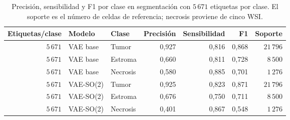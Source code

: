 \begin{table}[htbp]
    \centering
    \caption[Métricas por clase con el presupuesto completo.]{Precisión, sensibilidad y F1 por clase en segmentación con \(5\,671\) etiquetas por clase. El soporte es el número de celdas de referencia; necrosis proviene de cinco WSI.}
    \label{tab:tejido-clases-completo}
    \small
    \begin{tabular}{@{}rllrrrr@{}}
        \toprule
        Etiquetas/clase & Modelo & Clase & Precisión & Sensibilidad & F1 & Soporte \\
        \midrule
        \(5\,671\) & VAE base & Tumor & 0,927 & 0,816 & 0,868 & \(21\,796\) \\
        \(5\,671\) & VAE base & Estroma & 0,660 & 0,811 & 0,728 & \(8\,500\) \\
        \(5\,671\) & VAE base & Necrosis & 0,580 & 0,885 & 0,701 & \(1\,276\) \\
        \(5\,671\) & VAE-SO(2) & Tumor & 0,925 & 0,823 & 0,871 & \(21\,796\) \\
        \(5\,671\) & VAE-SO(2) & Estroma & 0,676 & 0,750 & 0,711 & \(8\,500\) \\
        \(5\,671\) & VAE-SO(2) & Necrosis & 0,401 & 0,867 & 0,548 & \(1\,276\) \\
        \bottomrule
    \end{tabular}
\end{table}

